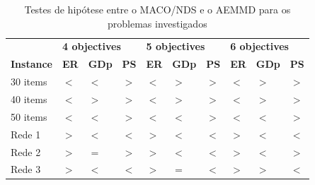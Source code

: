 \begin{table}[htb]
	\centering
	\def\arraystretch{1.0}
	\caption{Testes de hipótese entre o MACO/NDS e o AEMMD para os problemas investigados}
	\label{tab_ztest_meams}
	\begin{tabular}{llllllllll}
		& \multicolumn{3}{l}{\textbf{4 objectives}} & \multicolumn{3}{l}{\textbf{5 objectives}} & \multicolumn{3}{l}{\textbf{6 objectives
		}} \\
		\textbf{Instance} & \textbf{ER} & \textbf{GDp} & \textbf{PS} & \textbf{ER} & \textbf{GDp} & \textbf{PS} & \textbf{ER} & \textbf{GDp} & \textbf{PS} \\ \hline
		30 items & \cellcolor{table-green} $<$ & \cellcolor{table-green} $<$ & \cellcolor{table-green} $>$ & \cellcolor{table-green} $<$ & \cellcolor{table-red} $>$ & \cellcolor{table-green} $>$ & \cellcolor{table-green} $<$ & \cellcolor{table-red} $>$ & \cellcolor{table-green} $>$ \\
		40 items & \cellcolor{table-green} $<$ & \cellcolor{table-red} $>$ & \cellcolor{table-green} $>$ & \cellcolor{table-green} $<$ & \cellcolor{table-red} $>$ & \cellcolor{table-green} $>$ & \cellcolor{table-green} $<$ & \cellcolor{table-red} $>$ & \cellcolor{table-green} $>$ \\
		50 items & \cellcolor{table-green} $<$ & \cellcolor{table-green} $<$ & \cellcolor{table-green} $>$ & \cellcolor{table-green} $<$ & \cellcolor{table-green} $<$ & \cellcolor{table-green} $>$ & \cellcolor{table-green} $<$ & \cellcolor{table-green} $<$ & \cellcolor{table-green} $>$ \\  \hline 
		Rede 1 & \cellcolor{table-red} $>$ & \cellcolor{table-green} $<$ & \cellcolor{table-red} $<$ & \cellcolor{table-red} $>$ & \cellcolor{table-green} $<$ & \cellcolor{table-red} $<$ & \cellcolor{table-red} $>$ & \cellcolor{table-green} $<$ & \cellcolor{table-red} $<$ \\
		Rede 2 & \cellcolor{table-red} $>$ & \cellcolor{white} $=$ & \cellcolor{table-green} $>$ & \cellcolor{table-red} $>$ & \cellcolor{table-green} $<$ & \cellcolor{table-red} $<$ & \cellcolor{table-red} $>$ & \cellcolor{table-green} $<$ & \cellcolor{table-green} $>$ \\
		Rede 3 & \cellcolor{table-red} $>$ & \cellcolor{table-green} $<$ & \cellcolor{table-red} $<$ & \cellcolor{table-red} $>$ & \cellcolor{white} $=$ & \cellcolor{table-red} $<$ & \cellcolor{table-red} $>$ & \cellcolor{table-red} $>$ & \cellcolor{table-red} $<$ \\  \hline 
	\end{tabular}
\end{table}

